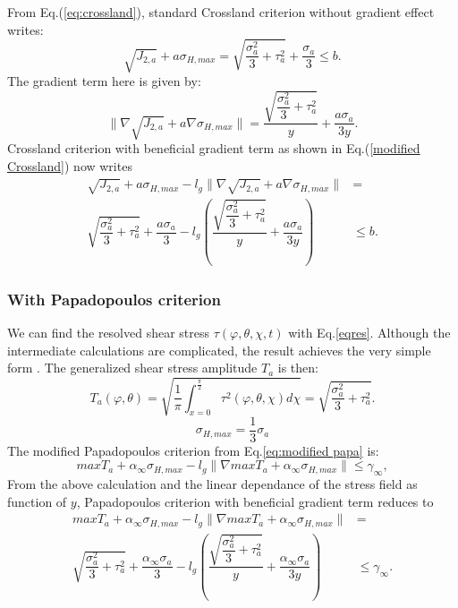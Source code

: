 \noindent From Eq.(\ref{eq:crossland}), standard Crossland criterion without gradient effect writes:
\begin{equation}
	\sqrt{J_{2,a}}+a\sigma_{H,max}=\sqrt{\dfrac{\sigma_a^2}{3}+\tau_a^2}+\dfrac{\sigma_a}{3}\leqslant b.
	\label{eqrbcross}
\end{equation}
The gradient term here is given by:
\begin{equation}
	\parallel{\nabla\sqrt{J_{2,a}}}+a{\nabla \sigma_{H,max}}\parallel= \dfrac{\sqrt{\dfrac{\sigma_a^2}{3}+\tau_a^2}}{y}+\dfrac{a\sigma_a}{3y}.
\end{equation}
Crossland criterion with beneficial gradient term as shown in Eq.(\ref{modified Crossland}) now writes
\begin{equation}
	\begin{split}
		\sqrt{J_{2,a}}+a\sigma_{H,max}-l_g\parallel{\nabla\sqrt{J_{2,a}}}+a\nabla{\sigma_{H,max}}\parallel&=\\\sqrt{\dfrac{\sigma_a^2}{3}+\tau_a^2}+\dfrac{a\sigma_a}{3}-l_g\left( \dfrac{\sqrt{\dfrac{\sigma_a^2}{3}+\tau_a^2}}{y}+\dfrac{a\sigma_a}{3y}\right) &\leqslant b.
	\end{split}
	\label{eq.arcblack}
\end{equation}
\subsubsection{With Papadopoulos criterion}
We can find the resolved shear stress $\tau(\varphi,\theta,\chi ,t)$ with Eq.\eqref{eqres}. Although the intermediate calculations are complicated, the result achieves the very simple form \cite{Papadopoulos1997219}. The generalized shear stress amplitude $T_a$ is then:
$$T_a(\varphi,\theta)=\sqrt{\dfrac{1}{\pi}\int_{x=0}^{\frac{\pi}{2}} \tau^2(\varphi,\theta,\chi)d\chi}
=\sqrt{\dfrac{\sigma_a^2}{3}+\tau_a^2}.
$$
$$\sigma_{H,max}=\dfrac{1}{3}\sigma_a$$
The modified Papadopoulos criterion from Eq.\eqref{eq:modified papa} is:
$$maxT_a+\alpha_\infty\sigma_{H,max}-l_g\parallel\nabla{maxT_a}+\alpha_\infty\sigma_{H,max}\parallel\leqslant \gamma_\infty,$$
From the above calculation and the linear dependance of the stress field as function of $y$, 
Papadopoulos criterion with beneficial gradient term reduces to 
\begin{equation}
	\begin{split}
		maxT_a+\alpha_\infty\sigma_{H,max}-l_g\parallel\nabla{maxT_a}+\alpha_\infty\sigma_{H,max}\parallel&=\\\sqrt{\dfrac{\sigma_a^2}{3}+\tau_a^2}+\dfrac{\alpha_\infty\sigma_a}{3}-l_g\left( \dfrac{\sqrt{\dfrac{\sigma_a^2}{3}+\tau_a^2}}{y}+\dfrac{\alpha_\infty\sigma_a}{3y}\right) &\leqslant \gamma_\infty.
	\end{split}
	\label{modified Papadopoulos}
\end{equation}

